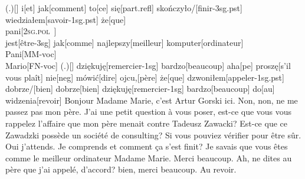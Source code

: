\documentclass[12pt,a4paper,french]{book}
\newcommand{\pv}{\textsc{2sg.pol}}
\begin{document}
{(.)}[{}]   i[et]   jak[comment]   to[ce]   się[{\sc part.refl}]
skończyło/[finir-{\sc 3sg.pst}] wiedziałem[savoir-{\sc 1sg.pst}]   że[que]
\\{pani}[\pv~] \\{jest}[être-{\sc 3sg}] jak[comme]
najlepszy[meilleur] komputer[ordinateur]   \\{Pani}[MM-{\sc voc}]
\\{Mario}[FN-{\sc voc}]   {(.)}[{}]   dziękuję[remercier-{\sc 1sg}]
bardzo[beaucoup]   aha[{\sc pe}]   proszę[{s'il vous plaît}]   nie[{\sc neg}]
mówić[dire]   ojcu,[père] że[que]   dzwoniłem[appeler-{\sc 1sg.pst}]
dobrze/[bien]   dobrze[bien] dziękuję[remercier-{\sc 1sg}] bardzo[beaucoup]
do[au]   widzenia[revoir]
%
\glft Bonjour Madame Marie, c'est Artur Gorski ici. Non, non, ne me passez pas
mon père. J'ai une petit question à vous poser, est-ce que vous vous rappelez
l'affaire que mon père menait contre Tadeusz Zawacki? Est-ce que ce Zawadzki
possède un société de consulting? Si vous pouviez vérifier pour être sûr.
Oui j'attends. Je comprends et comment ça s'est finit? Je savais que vous êtes
comme le meilleur ordinateur Madame Marie. Merci beaucoup. Ah, ne dites au père
que j'ai appelé, d'accord? bien, merci beaucoup. Au revoir.
\endgl
\xe
\end{document}
